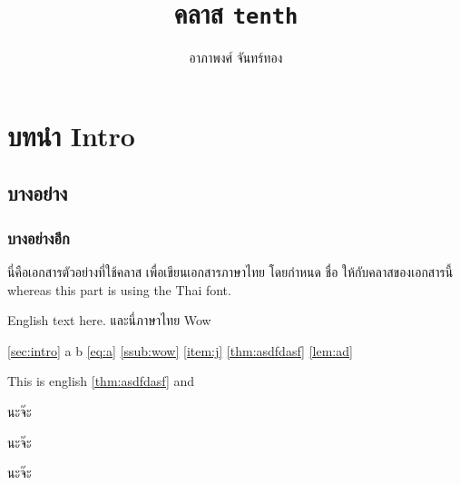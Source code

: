 \usepackage{lipsum}
\title{คลาส \texttt{tenth}}
\author{อาภา{\wbr}พงศ์ จันทร์{\wbr}ทอง}

\newrobustcmd{\codehl}{\texttt}


    \maketitle

    \section{บทนำ Intro \label{sec:intro}}
    \subsection{บาง{\wbr}อย่าง}
    \subsubsection{บาง{\wbr}อย่าง{\wbr}อีก \label{ssub:wow}}

    \makeatletter

    นี่{\wbr}คือ{\wbr}เอกสาร{\wbr}ตัวอย่าง{\wbr}ที่{\wbr}ใช้{\wbr}คลาส  เพื่อ{\wbr}เขียน{\wbr}เอกสาร{\wbr}ภาษา{\wbr}ไทย โดย{\wbr}กำหนด  ชื่อ  ให้{\wbr}กับ{\wbr}คลาส{\wbr}ของ{\wbr}เอกสาร{\wbr}นี้  whereas this part is using the Thai font.

    \begin{eng}
        English text here. {\tha และ{\wbr}นี่\sffamily ภาษา{\wbr}ไทย \eng Wow}
    \end{eng}

    \autoref{sec:intro} a \sectionautorefname{} b \autoref{eq:a} \autoref{ssub:wow} \autoref{item:j}
    \Hfootnoteautorefname{} \AMSautorefname{} \autoref{thm:asdfdasf} \autoref{lem:ad} \lemmaautorefname{}

    { This is english \autoref{thm:asdfdasf} and \chaptername}

    \begin{theorem}
        \label{thm:asdfdasf}
        นะ{\wbr}จ๊ะ{\wbr}
    \end{theorem}
    \unskip
    \begin{lemma}
        \label{lem:ad}
        นะ{\wbr}จ๊ะ{\wbr}
    \end{lemma}

    \begin{remark}
        นะ{\wbr}จ๊ะ{\wbr}
    \end{remark}

